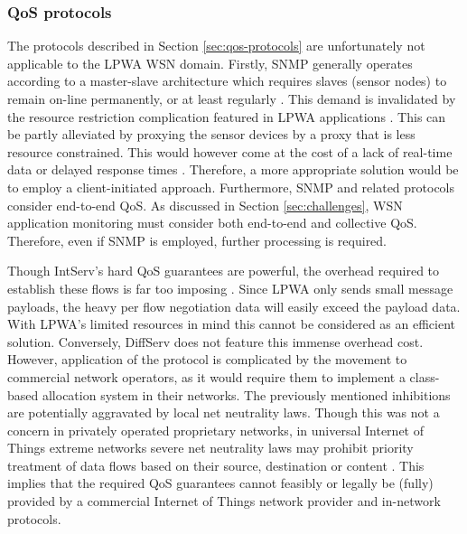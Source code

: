 \subsubsection{QoS protocols}
The protocols described in Section \ref{sec:qos-protocols} are unfortunately not applicable to the LPWA WSN domain. Firstly, SNMP generally operates according to a master-slave architecture \cite{snmp_server_initiated} which requires slaves (sensor nodes) to remain on-line permanently, or at least regularly \cite{snmp_architecture}. This demand is invalidated by the resource restriction complication featured in LPWA applications \cite{key_features}. This can be partly alleviated by proxying the sensor devices by a proxy that is less resource constrained. This would however come at the cost of a lack of real-time data or delayed response times \cite{snmp_proxy}. Therefore, a more appropriate solution would be to employ a client-initiated approach. Furthermore, SNMP and related protocols consider end-to-end QoS. As discussed in Section \ref{sec:challenges}, WSN application monitoring must consider both end-to-end and collective QoS. Therefore, even if SNMP is employed, further processing is required.

Though IntServ's hard QoS guarantees are powerful, the overhead required to establish these flows is far too imposing \cite{intserv_diffserv_too_complex, qos_challenges}. Since LPWA only sends small message payloads, the heavy per flow negotiation data will easily exceed the payload data. With LPWA's limited resources in mind this cannot be considered as an efficient solution. Conversely, DiffServ does not feature this immense overhead cost. However, application of the protocol is complicated by the movement to commercial network operators, as it would require them to implement a class-based allocation system in their networks. The previously mentioned inhibitions are potentially aggravated by local net neutrality laws. Though this was not a concern in privately operated proprietary networks, in universal Internet of Things extreme networks severe net neutrality laws may prohibit priority treatment of data flows based on their source, destination or content \cite{net_neutrality}. This implies that the required QoS guarantees cannot feasibly or legally be (fully) provided by a commercial Internet of Things network provider and in-network protocols. 

